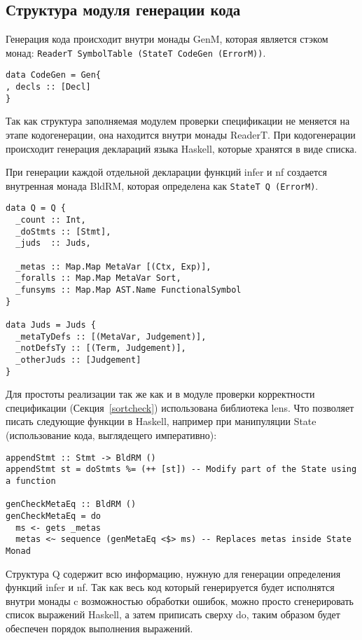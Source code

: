 \subsection{Структура модуля генерации кода}\label{repr}
Генерация кода происходит внутри монады GenM, которая является стэком монад: \lstinline{ReaderT SymbolTable (StateT CodeGen (ErrorM))}.

\begin{lstlisting}[caption={Структура используемая при кодогенерации},captionpos=b,frame=single]
data CodeGen = Gen{
, decls :: [Decl]
}
\end{lstlisting}

Так как структура заполняемая модулем проверки спецификации не меняется на этапе кодогенерации, она находится внутри монады ReaderT. При кодогенерации происходит генерация деклараций языка Haskell, которые хранятся в виде списка.

При генерации каждой отдельной декларации функций infer и nf создается внутренная монада BldRM, которая определена как \lstinline{StateT Q (ErrorM)}.

\begin{lstlisting}[caption={Структура используемая при кодогенерации функции infer},captionpos=b,frame=single]
data Q = Q {
  _count :: Int,
  _doStmts :: [Stmt],
  _juds  :: Juds,

  _metas :: Map.Map MetaVar [(Ctx, Exp)],
  _foralls :: Map.Map MetaVar Sort,
  _funsyms :: Map.Map AST.Name FunctionalSymbol
}

data Juds = Juds {
  _metaTyDefs :: [(MetaVar, Judgement)],
  _notDefsTy :: [(Term, Judgement)],
  _otherJuds :: [Judgement]
}
\end{lstlisting}

Для простоты реализации так же как и в модуле проверки корректности спецификации (Секция~\ref{sortcheck}) использована библиотека lens\cite{lens}. Что позволяет писать следующие функции в Haskell, например при манипуляции State (использование кода, выглядещего императивно):
\begin{lstlisting}[frame=single]
appendStmt :: Stmt -> BldRM ()
appendStmt st = doStmts %= (++ [st]) -- Modify part of the State using a function

genCheckMetaEq :: BldRM ()
genCheckMetaEq = do
  ms <- gets _metas
  metas <~ sequence (genMetaEq <$> ms) -- Replaces metas inside State Monad
\end{lstlisting}

Структура Q содержит всю информацию, нужную для генерации определения функций infer и nf. Так как весь код который генерируется будет исполнятся внутри монады c возможностью обработки ошибок, можно просто сгенерировать список выражений Haskell, а затем приписать сверху do, таким образом будет обеспечен порядок выполнения выражений.

